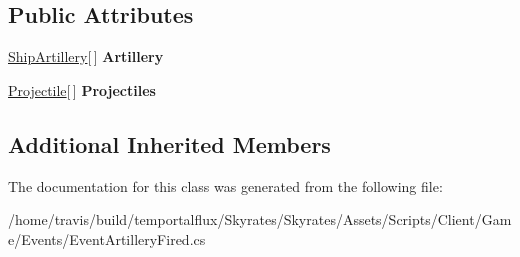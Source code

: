 \subsection*{Public Attributes}
\begin{DoxyCompactItemize}
\item 
\hypertarget{class_skyrates_1_1_client_1_1_game_1_1_event_1_1_event_artillery_fired_ad5f2f6d38c26018d0f6071554599b492}{\hyperlink{class_skyrates_1_1_client_1_1_ship_1_1_ship_artillery}{Ship\-Artillery}\mbox{[}$\,$\mbox{]} {\bfseries Artillery}}\label{class_skyrates_1_1_client_1_1_game_1_1_event_1_1_event_artillery_fired_ad5f2f6d38c26018d0f6071554599b492}

\item 
\hypertarget{class_skyrates_1_1_client_1_1_game_1_1_event_1_1_event_artillery_fired_a476b261a99e012adc7fc36e72edef2be}{\hyperlink{class_projectile}{Projectile}\mbox{[}$\,$\mbox{]} {\bfseries Projectiles}}\label{class_skyrates_1_1_client_1_1_game_1_1_event_1_1_event_artillery_fired_a476b261a99e012adc7fc36e72edef2be}

\end{DoxyCompactItemize}
\subsection*{Additional Inherited Members}


The documentation for this class was generated from the following file\-:\begin{DoxyCompactItemize}
\item 
/home/travis/build/temportalflux/\-Skyrates/\-Skyrates/\-Assets/\-Scripts/\-Client/\-Game/\-Events/Event\-Artillery\-Fired.\-cs\end{DoxyCompactItemize}
